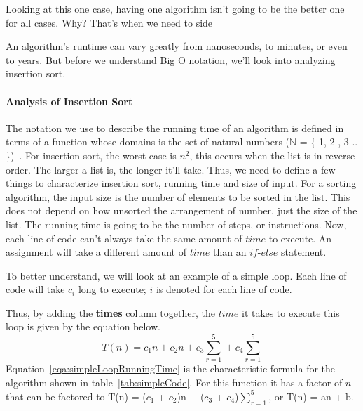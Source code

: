 \documentclass[12pt]{article}
\begin{document}
	Looking at this one case, having one algorithm isn't going to be the better one for all cases.
	Why? That's when we need to side 
	
	An algorithm's runtime can vary greatly from nanoseconds, to minutes, or even to years.
	But before we understand Big O notation, we’ll look into analyzing insertion sort.
	
	
	\paragraph{Analysis of Insertion Sort}
	
	The notation we use to describe the running time of an algorithm is defined in terms of a function whose domains is the set of natural numbers ($\mathbb{N}$ = \{ 1, 2 , 3 .. \})~\cite[p.~43]{intro}.
	For insertion sort, the worst-case is $n^2$, this occurs when the list is in reverse order.
	The larger a list is, the longer it'll take.
	Thus, we need to define a few things to characterize insertion sort, running time and size of input.
	For a sorting algorithm, the input size is the number of elements to be sorted in the list.
	This does not depend on how unsorted the arrangement of number, just the size of the list.
	The running time is going to be the number of steps, or instructions.
	Now, each line of code can't always take the same amount of $\textit{time}$ to execute.
	An assignment will take a different amount of $\textit{time}$ than an $\textit{if-else}$ statement.
	
	To better understand, we will look at an example of a simple loop.
	Each line of code will take $c_i$ long to execute; $i$ is denoted for each line of code.
	
	Thus, by adding the \textbf{times} column together, the $\textit{time}$ it takes to execute this loop is given by the equation below.
	\begin{equation}
	T(n) = c_1n + c_2n + c_3\sum_{r=1}^{5} + c_4\sum_{r=1}^{5}
	\label{eqa:simpleLoopRunningTime}
	\end{equation}
	Equation~\ref{eqa:simpleLoopRunningTime} is the characteristic formula for the algorithm shown in table~\ref{tab:simpleCode}.
	For this function it has a factor of $n$ that can be factored to T(n) = ($c_1$ + $c_2$)n + ($c_3$ + $c_4$)$\sum_{r=1}^{5}$, or T(n) = an + b.
	
\end{document}
